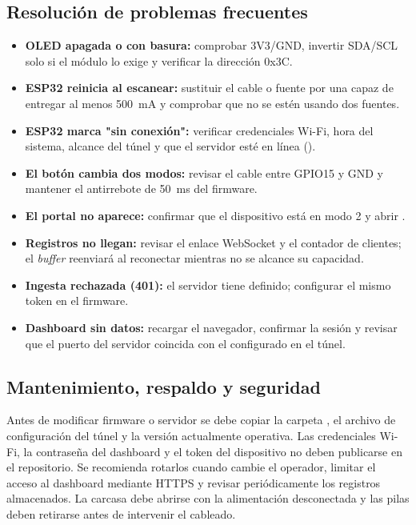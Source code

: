 \subsection{Resolución de problemas frecuentes}
\begin{itemize}[leftmargin=1.4em]
  \item \textbf{OLED apagada o con basura:} comprobar 3V3/GND, invertir SDA/SCL solo si el módulo lo exige y verificar la dirección 0x3C.
  \item \textbf{ESP32 reinicia al escanear:} sustituir el cable o fuente por una capaz de entregar al menos 500~mA y comprobar que no se estén usando dos fuentes.
  \item \textbf{ESP32 marca "sin conexión":} verificar credenciales Wi\nobreakdash-Fi, hora del sistema, alcance del túnel y que el servidor esté en línea ().
  \item \textbf{El botón cambia dos modos:} revisar el cable entre GPIO15 y GND y mantener el antirrebote de 50~ms del firmware.
  \item \textbf{El portal no aparece:} confirmar que el dispositivo está en modo 2 y abrir .
  \item \textbf{Registros no llegan:} revisar el enlace WebSocket y el contador de clientes; el \emph{buffer} reenviará al reconectar mientras no se alcance su capacidad.
  \item \textbf{Ingesta rechazada (401):} el servidor tiene  definido; configurar el mismo token en el firmware.
  \item \textbf{Dashboard sin datos:} recargar el navegador, confirmar la sesión y revisar que el puerto del servidor coincida con el configurado en el túnel.
\end{itemize}

\subsection{Mantenimiento, respaldo y seguridad}
Antes de modificar firmware o servidor se debe copiar la carpeta , el
archivo de configuración del túnel y la versión actualmente operativa. Las
credenciales Wi\nobreakdash-Fi, la contraseña del dashboard y el token del dispositivo
no deben publicarse en el repositorio. Se recomienda rotarlos cuando cambie el
operador, limitar el acceso al dashboard mediante HTTPS y revisar periódicamente
los registros almacenados. La carcasa debe abrirse con la alimentación desconectada
y las pilas deben retirarse antes de intervenir el cableado.
